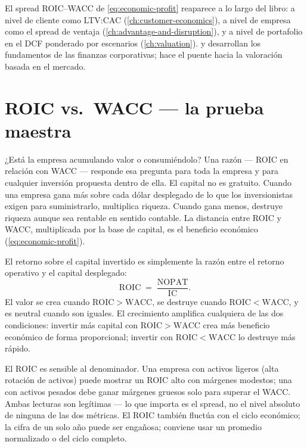 El spread ROIC--WACC de \cref{eq:economic-profit} reaparece a lo largo del libro: a nivel
de cliente como LTV:CAC (\cref{ch:customer-economics}), a nivel de empresa como el spread
de ventaja (\cref{ch:advantage-and-disruption}), y a nivel de portafolio en el DCF ponderado por
escenarios (\cref{ch:valuation}). \textcite{ross2022} y \textcite{brealey2020} desarrollan los
fundamentos de las finanzas corporativas; \textcite{berk6thcorporate} hace el puente hacia la
valoración basada en el mercado.

\section{ROIC vs.\ WACC --- la prueba maestra}\label{sec:roic-wacc}

¿Está la empresa acumulando valor o consumiéndolo? Una razón --- ROIC en relación con WACC ---
responde esa pregunta para toda la empresa y para cualquier inversión propuesta dentro de ella.
El capital no es gratuito. Cuando una empresa gana más sobre cada dólar desplegado de lo que los
inversionistas exigen para suministrarlo, multiplica riqueza. Cuando gana menos, destruye riqueza
aunque sea rentable en sentido contable. La distancia entre ROIC y WACC, multiplicada por la base
de capital, es el beneficio económico (\cref{eq:economic-profit}).

El retorno sobre el capital invertido es simplemente la razón entre el retorno operativo y el
capital desplegado:
\begin{equation}\label{eq:roic}
  \mathrm{ROIC} \;=\; \frac{\mathrm{NOPAT}}{\mathrm{IC}}.
\end{equation}
El valor se crea cuando \(\mathrm{ROIC}>\mathrm{WACC}\), se destruye cuando
\(\mathrm{ROIC}<\mathrm{WACC}\), y es neutral cuando son iguales. El crecimiento amplifica
cualquiera de las dos condiciones: invertir más capital con \(\mathrm{ROIC}>\mathrm{WACC}\)
crea más beneficio económico de forma proporcional; invertir con \(\mathrm{ROIC}<\mathrm{WACC}\)
lo destruye más rápido.

El ROIC es sensible al denominador. Una empresa con activos ligeros (alta rotación de activos)
puede mostrar un ROIC alto con márgenes modestos; una con activos pesados debe ganar márgenes
gruesos solo para superar el WACC. Ambas lecturas son legítimas --- lo que importa es el
spread, no el nivel absoluto de ninguna de las dos métricas. El ROIC también fluctúa con
el ciclo económico; la cifra de un solo año puede ser engañosa; conviene usar un promedio
normalizado o del ciclo completo.

